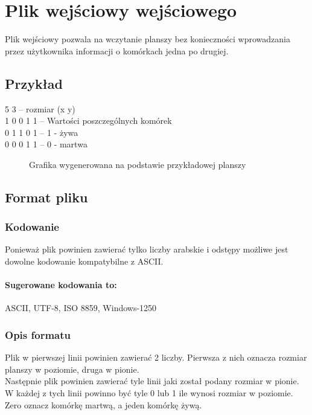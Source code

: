 \documentclass{report}
\begin{document}
\section{Plik wejściowy wejściowego}  \label{format}
Plik wejściowy pozwala na wczytanie planszy bez konieczności wprowadzania przez użytkownika informacji o komórkach jedna po drugiej.

\subsection{Przykład}
5 3 \tab -- rozmiar (x y) \\
1 0 0 1 1 \tab -- Wartości poszczególnych komórek \\
0 1 1 0 1 \tab -- 1 - żywa \\
0 0 0 1 1 \tab -- 0 - martwa \\

\begin{figure}[h]
\centering
\setlength{\fboxsep}{0pt} %
\setlength{\fboxrule}{1pt} %
\caption{Grafika wygenerowana na podstawie przykładowej planszy}
\end{figure}



\subsection{Format pliku}
\subsubsection*{Kodowanie}
Ponieważ plik powinien zawierać tylko liczby arabskie i odstępy możliwe jest dowolne kodowanie kompatybilne z ASCII. \\
\paragraph{Sugerowane kodowania to:}
ASCII, UTF-8, ISO 8859, Windows-1250

\subsubsection*{Opis formatu}
Plik w pierwszej linii powinien zawierać 2 liczby. Pierwsza z nich oznacza rozmiar planszy w poziomie, druga w pionie. \\
Następnie plik powinien zawierać tyle linii jaki został podany rozmiar w pionie. W każdej z tych linii powinno być tyle 0 lub 1 ile wynosi rozmiar w poziomie. \\
Zero oznacz komórkę martwą, a jeden komórkę żywą.
\end{document}
